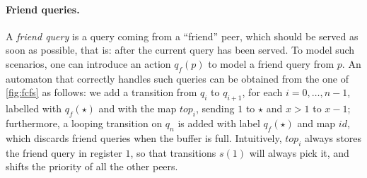 \paragraph{Friend queries.} A \emph{friend query} is a query coming from a ``friend'' peer, which should be served as soon as possible, that is: after the current query has been served. To model such scenarios, one can introduce an action $q_f(p)$ to model a friend query from $p$. An automaton that correctly handles such queries can be obtained from the one of \autoref{fig:fcfs} as follows: we add a transition from $q_i$ to $q_{i+1}$, for each $i=0,\dots,n-1$, labelled with $q_f(\star)$ and with the map $top_i$, sending $1$ to $\star$ and $x > 1$ to $x-1$; furthermore, a looping transition on $q_n$ is added with label $q_f(\star)$ and map $id$, which discards friend queries when the buffer is full. Intuitively, $top_i$ always stores the friend query in register $1$, so that transitions $s(1)$ will always pick it, and shifts the priority of all the other peers.

